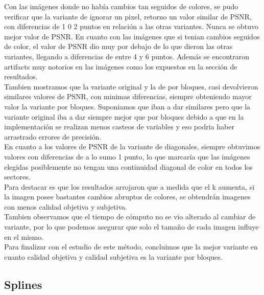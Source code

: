 \documentclass[a4paper]{article}
\newcounter{col}
\begin{document}
 Con las im\'agenes donde no hab\'ia cambios tan seguidos de colores, se pudo verificar que la variante de ignorar un pixel, retorno un valor similar de PSNR, con diferencias de 1 0 2 puntos en relaci\'on a las otras variantes. Nunca se obtuvo mejor valor de PSNR.
 En cuanto con las im\'agenes que si tenian cambios seguidos de color, el valor de PSNR dio muy por debajo de lo que dieron las otras variantes, llegando a diferencias de entre 4 y 6 puntos. Adem\'as se encontraron artifacts muy notorios en las im\'agenes como los expuestos en la secci\'on de resultados.\\
 Tambien mostramos que la variante original y la de por bloques, casi devolvieron similares valores de PSNR, con minimas diferencias, siempre obteniendo mayor valor la variante por bloques. Suponiamos que iban a dar similares pero que la variante original iba a dar siempre mejor que por bloques debido a que en la implementaci\'on se realizan menos casteos de variables y eso podria haber arrastrado errores de precisi\'on.\\
 En cuanto a los valores de PSNR de la variante de diagonales, siempre obtuvimos valores con diferencias de a lo sumo 1 punto, lo que marcar\'ia que las im\'agenes elegidas posiblemente no tengan una continuidad diagonal de color en todos los sectores.\\
 Para destacar es que los resultados arrojaron que a medida que el k aumenta, si la imagen posee bastantes cambios abruptos de colores, se obtendr\'an imagenes con menos calidad objetiva y subjetiva.\\
 Tambien observamos que el tiempo de c\'omputo no se vio alterado al cambiar de variante, por lo que podemos asegurar que solo el tamaño de cada imagen influye en el mismo.\\
 Para finalizar con el estudio de este m\'etodo, concluimos que la mejor variante en cuanto calidad objetiva y calidad subjetiva es la variante por bloques.

\subsection{Splines}
\label{Splines}
\end{document}
